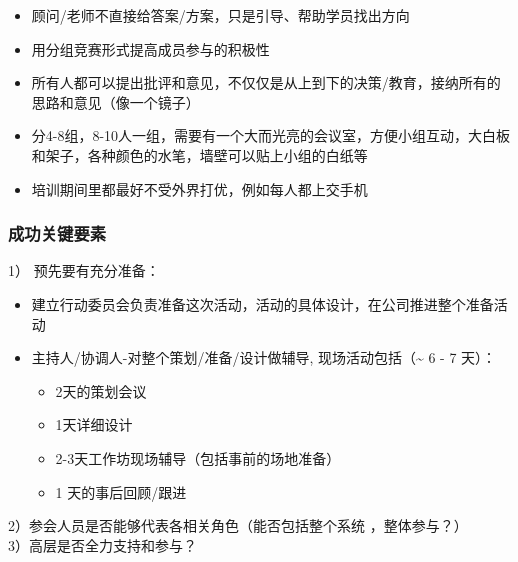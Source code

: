 \begin{itemize}
\tightlist
\item
  顾问/老师不直接给答案/方案，只是引导、帮助学员找出方向
\item
  用分组竞赛形式提高成员参与的积极性
\item
  所有人都可以提出批评和意见，不仅仅是从上到下的决策/教育，接纳所有的思路和意见（像一个镜子）
\item
  分4-8组，8-10人一组，需要有一个大而光亮的会议室，方便小组互动，大白板和架子，各种颜色的水笔，墙壁可以贴上小组的白纸等
\item
  培训期间里都最好不受外界打优，例如每人都上交手机
\end{itemize}

\hypertarget{ux6210ux529fux5173ux952eux8981ux7d20}{%
\subsubsection{成功关键要素}\label{ux6210ux529fux5173ux952eux8981ux7d20}}

1） 预先要有充分准备：

\begin{itemize}
\tightlist
\item
  建立行动委员会负责准备这次活动，活动的具体设计，在公司推进整个准备活动
\item
  主持人/协调人-对整个策划/准备/设计做辅导,
  现场活动包括（\textasciitilde{} 6 - 7 天）：

  \begin{itemize}
  \tightlist
  \item
    2天的策划会议
  \item
    1天详细设计
  \item
    2-3天工作坊现场辅导（包括事前的场地准备）
  \item
    1 天的事后回顾/跟进\\
  \end{itemize}
\end{itemize}

2）参会人员是否能够代表各相关角色（能否包括整个系统 ，整体参与？）\\
3）高层是否全力支持和参与？


